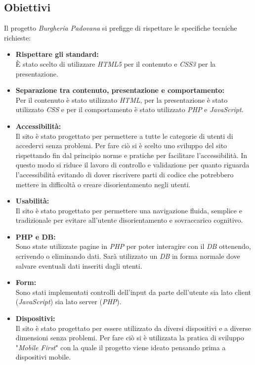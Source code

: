 \subsection{Obiettivi}
Il progetto \emph{Burgheria Padovana} si prefigge di rispettare le specifiche tecniche richieste:
\begin{itemize}
	\item \textbf{Rispettare gli standard:}\\ 
	È stato scelto di utilizzare \emph{HTML5} per il contenuto e \emph{CSS3} per la presentazione.
	\item \textbf{Separazione tra contenuto, presentazione e comportamento:}\\ 
	Per il contenuto è stato utilizzato \emph{HTML}, per la presentazione è stato utilizzato \emph{CSS} e per il comportamento è stato utilizzato \emph{PHP} e \emph{JavaScript}.
	\item \textbf{Accessibilità:}\\ 
	Il sito è stato progettato per permettere a tutte le categorie di utenti di accedervi senza problemi.
	Per fare ciò si è scelto uno sviluppo del sito rispettando fin dal principio norme e pratiche per facilitare l'accessibilità.
	In questo modo si riduce il lavoro di controllo e validazione per quanto riguarda l'accessibilità evitando di dover riscrivere parti di codice che potrebbero mettere in difficoltà o creare disorientamento negli utenti.
	\item \textbf{Usabilità:}\\
	Il sito è stato progettato per permettere una navigazione fluida, semplice e tradizionale per evitare all'utente disorientamento e sovraccarico cognitivo.
	\item \textbf{PHP e DB:}\\
	Sono state utilizzate pagine in \emph{PHP} per poter interagire con il \emph{DB} ottenendo, scrivendo o eliminando dati. Sarà utilizzato un \emph{DB} in forma normale dove salvare eventuali dati inseriti dagli utenti.
	\item \textbf{Form:}\\
	Sono stati implementati controlli dell'input da parte dell'utente sia lato client (\emph{JavaScript}) sia lato server (\emph{PHP}).
	\item \textbf{Dispositivi:}\\
	Il sito è stato progettato per essere utilizzato da diversi dispositivi e a diverse dimensioni senza problemi. Per fare ciò si è utilizzata la pratica di sviluppo "\emph{Mobile First}" con la quale il progetto viene ideato pensando prima a dispositivi mobile.
\end{itemize}
